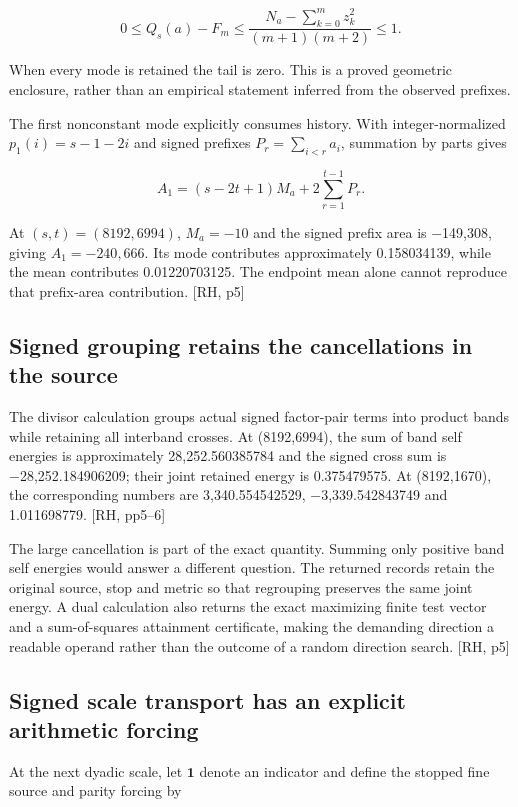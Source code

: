 \[
0\le Q_s(a)-F_m\le\frac{N_a-\sum_{k=0}^{m}z_k^2}{(m+1)(m+2)}\le1.
\]

When every mode is retained the tail is zero. This is a proved geometric enclosure, rather than an empirical statement inferred from the observed prefixes.

The first nonconstant mode explicitly consumes history. With integer-normalized \(p_1(i)=s-1-2i\) and signed prefixes \(P_r=\sum_{i<r}a_i\), summation by parts gives

\[
A_1=(s-2t+1)M_a+2\sum_{r=1}^{t-1}P_r.
\]

At \((s,t)=(8192,6994)\), \(M_a=-10\) and the signed prefix area is −149,308, giving \(A_1=-240{,}666\). Its mode contributes approximately 0.158034139, while the mean contributes 0.01220703125. The endpoint mean alone cannot reproduce that prefix-area contribution. {[}RH, p5{]}

\subsection{Signed grouping retains the cancellations in the source}\label{signed-grouping-retains-the-cancellations-in-the-source}

The divisor calculation groups actual signed factor-pair terms into product bands while retaining all interband crosses. At (8192,6994), the sum of band self energies is approximately 28,252.560385784 and the signed cross sum is −28,252.184906209; their joint retained energy is 0.375479575. At (8192,1670), the corresponding numbers are 3,340.554542529, −3,339.542843749 and 1.011698779. {[}RH, pp5--6{]}

The large cancellation is part of the exact quantity. Summing only positive band self energies would answer a different question. The returned records retain the original source, stop and metric so that regrouping preserves the same joint energy. A dual calculation also returns the exact maximizing finite test vector and a sum-of-squares attainment certificate, making the demanding direction a readable operand rather than the outcome of a random direction search. {[}RH, p5{]}

\subsection{Signed scale transport has an explicit arithmetic forcing}\label{signed-scale-transport-has-an-explicit-arithmetic-forcing}

At the next dyadic scale, let \(\mathbf1\) denote an indicator and define the stopped fine source and parity forcing by

